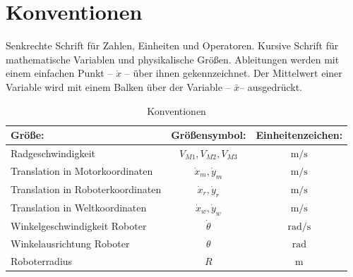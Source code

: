\cleardoublepage 
\chapter*{Konventionen}
Senkrechte Schrift für Zahlen, Einheiten und Operatoren. Kursive Schrift für mathematische Variablen und physikalische Größen. Ableitungen werden mit einem einfachen Punkt -- $\dot{x}$ -- über ihnen gekennzeichnet. Der Mittelwert einer Variable wird mit einem Balken über der Variable -- $\bar{x}$-- ausgedrückt.
\begin{table}[H]
\centering
\caption{Konventionen}
\begin{tabular}{l|c|c}
    \textbf{Größe:}&\textbf{Größensymbol:} & \textbf{Einheitenzeichen:} \\
    \hline
	Radgeschwindigkeit 						& $V_{M1},V_{M2},V_{M3}$& $\si{\m\per\s}$\\
    Translation in Motorkoordinaten			& $\dot{x}_m,\dot{y}_m$	& $\si{\m\per\s}$\\
	Translation in Roboterkoordinaten		& $\dot{x}_r,\dot{y}_r$ & $\si{\m\per\s}$\\
	Translation in Weltkoordinaten 			& $\dot{x}_w,\dot{y}_w$	& $\si{\m\per\s}$\\
	Winkelgeschwindigkeit Roboter 			& $\dot{\theta}$ 		& $\mathrm{rad}\si{\per\s}$\\
	Winkelausrichtung Roboter 				& $\theta$ 				& $\mathrm{rad}$\\
	Roboterradius 							& $R$ 					& $\si{\m}$\\
	\end{tabular}
\label{tab:Konventionen}
\end{table}
